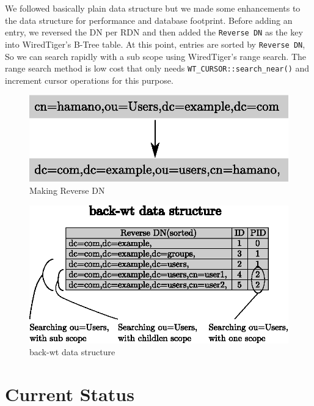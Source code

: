 \documentclass[a4paper
,12
,twocolumn
]{article}
\begin{document}
We followed basically plain data structure but we made some enhancements
to the data structure for performance and database footprint. Before
adding an entry, we reversed the DN per RDN and then added the
\texttt{Reverse\ DN} as the key into WiredTiger's B-Tree table. At this
point, entries are sorted by \texttt{Reverse\ DN}, So we can search
rapidly with a sub scope using WiredTiger's range search. The range
search method is low cost that only needs
\texttt{WT\_CURSOR::search\_near()} and increment cursor operations for
this purpose.

\begin{figure}[H]
\centering
\includegraphics[width=0.9\columnwidth]{figure/reverse_dn.eps}
\caption{Making Reverse DN}
\end{figure}

\begin{figure}[H]
\centering
\includegraphics[width=0.9\columnwidth]{figure/back-wt_data_structure.eps}
\caption{back-wt data structure}
\end{figure}

\section{Current Status}\label{current-status}
\end{document}
